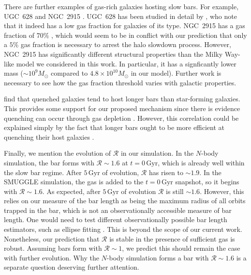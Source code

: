 \documentclass[twocolumn,linenumbers,trackchanges]{aastex631}
\newcommand{\Rot}{\ensuremath{\mathcal{R}}}
\newcommand{\Msun}{\ensuremath{M_{\odot}}}
\begin{document}
There are further examples of gas-rich galaxies hosting slow bars. For
example, UGC~628 \citep[$\Rot\sim2$;][]{2009AA...499L..25C} and NGC~2915
\citep[$\Rot>1.7$;][]{1999AJ....118.2158B}. UGC~628
has been studied in detail by \citet{2016MNRAS.463.1751C}, who note that it
indeed has a low gas fraction for galaxies of its type. NGC~2915 has a gas
fraction of $70\%$ \citep{2010ApJ...715..656W}, which would seem to be in
conflict with our prediction that only a $5\%$ gas fraction is necessary to
arrest the halo slowdown process. However, NGC~2915 has significantly different
structural properties than the Milky Way-like model we considered in this work.
In particular, it has a signficantly lower mass ($\sim10^9\Msun$ compared to
$4.8\times10^{10}\Msun$ in our model). Further work is necessary to see how the
gas fraction threshold varies with galactic properties.

\citet{2020MNRAS.495.4158F} find that quenched galaxies tend to host longer bars
than star-forming galaxies. This provides some support for our proposed
mechanism since there is evidence quenching can occur through gas depletion
\citep[e.g.][]{2021Natur.597..485W}. However, this correlation could be
explained simply by the fact that longer bars ought to be more efficient at
quenching their host galaxies \citep[e.g][]{2015AA...580A.116G}.

Finally, we mention the evolution of \Rot{} in our simulation. In the
$N$-body simulation, the bar forms with $\Rot\sim1.6$ at $t=0\,\textrm{Gyr}$,
which is already well within the slow bar regime. After $5\,\textrm{Gyr}$ of
evolution, \Rot{} has risen to $\sim1.9$. In the SMUGGLE simulation, the gas is
added to the $t=0\,\textrm{Gyr}$ snapshot, so it begins with $\Rot{}\sim1.6$. As
expected, after $5\,\textrm{Gyr}$ of evolution \Rot{} is still $\sim1.6$.
However, this relies on our measure of the bar length as being the maximum
radius of all orbits trapped in the bar, which is not an observationally
accessible measure of bar length. One would need to test different
observationally possible bar length estimators, such as ellipse fitting
\citep{1990MNRAS.245..130A, 1999AAS..140....1M, 2002MNRAS.330...35A,
2006AA...452...97M, 2009AA...495..491A, 2015AA...576A.102A}. This is beyond the
scope of our current work. Nonetheless, our prediction that \Rot{} is stable in
the presence of sufficient gas is robust. Assuming bars form with $\Rot\sim1$,
we predict this should remain the case with further evolution. Why the $N$-body
simulation forms a bar with $\Rot\sim1.6$ is a separate question deserving
further attention.
\end{document}

